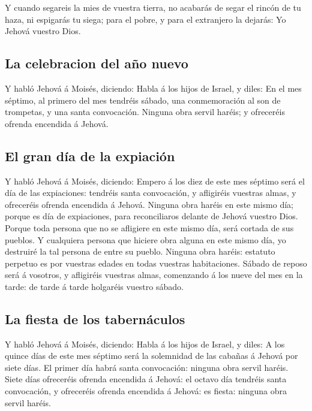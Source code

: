  Y cuando segareis la mies de vuestra tierra, no acabarás
de segar el rincón de tu haza, ni espigarás tu siega; para el pobre, y
para el extranjero la dejarás: Yo Jehová vuestro Dios.

\hypertarget{la-celebracion-del-auxf1o-nuevo}{%
\subsection{La celebracion del año
nuevo}\label{la-celebracion-del-auxf1o-nuevo}}

 Y habló Jehová á Moisés, diciendo:  Habla
á los hijos de Israel, y diles: En el mes séptimo, al primero del mes
tendréis sábado, una conmemoración al son de trompetas, y una santa
convocación.  Ninguna obra servil haréis; y ofreceréis
ofrenda encendida á Jehová.

\hypertarget{el-gran-duxeda-de-la-expiaciuxf3n}{%
\subsection{El gran día de la
expiación}\label{el-gran-duxeda-de-la-expiaciuxf3n}}

 Y habló Jehová á Moisés, diciendo: 
Empero á los diez de este mes séptimo será el día de las expiaciones:
tendréis santa convocación, y afligiréis vuestras almas, y ofreceréis
ofrenda encendida á Jehová.  Ninguna obra haréis en este
mismo día; porque es día de expiaciones, para reconciliaros delante de
Jehová vuestro Dios.  Porque toda persona que no se
afligiere en este mismo día, será cortada de sus pueblos.
 Y cualquiera persona que hiciere obra alguna en este
mismo día, yo destruiré la tal persona de entre su pueblo.
 Ninguna obra haréis: estatuto perpetuo es por vuestras
edades en todas vuestras habitaciones.  Sábado de reposo
será á vosotros, y afligiréis vuestras almas, comenzando á los nueve del
mes en la tarde: de tarde á tarde holgaréis vuestro sábado.

\hypertarget{la-fiesta-de-los-tabernuxe1culos}{%
\subsection{La fiesta de los
tabernáculos}\label{la-fiesta-de-los-tabernuxe1culos}}

 Y habló Jehová á Moisés, diciendo:  Habla
á los hijos de Israel, y diles: A los quince días de este mes séptimo
será la solemnidad de las cabañas á Jehová por siete días.
 El primer día habrá santa convocación: ninguna obra
servil haréis.  Siete días ofreceréis ofrenda encendida á
Jehová: el octavo día tendréis santa convocación, y ofreceréis ofrenda
encendida á Jehová: es fiesta: ninguna obra servil haréis.

